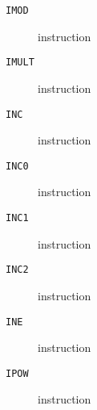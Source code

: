 \clearpage
\begin{description}
\item[\texttt{IMOD}] instruction\\

\end{description}
\clearpage
\begin{description}
\item[\texttt{IMULT}] instruction\\

\end{description}
\clearpage
\begin{description}
\item[\texttt{INC}] instruction\\

\end{description}
\clearpage
\begin{description}
\item[\texttt{INC0}] instruction\\

\end{description}
\clearpage
\begin{description}
\item[\texttt{INC1}] instruction\\

\end{description}
\clearpage
\begin{description}
\item[\texttt{INC2}] instruction\\

\end{description}
\clearpage
\begin{description}
\item[\texttt{INE}] instruction\\

\end{description}
\clearpage
\begin{description}
\item[\texttt{IPOW}] instruction\\

\end{description}
